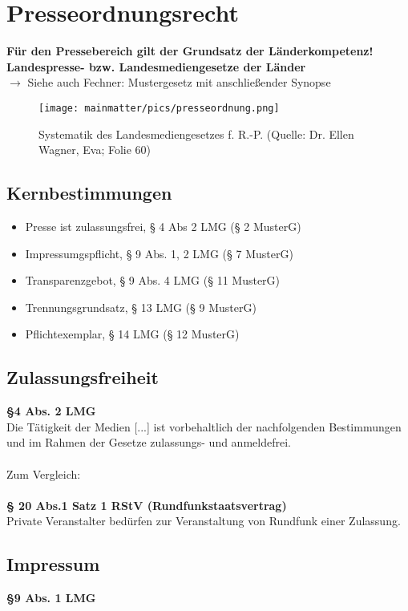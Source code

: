\chapter{Presseordnungsrecht}
\textbf{Für den Pressebereich gilt der Grundsatz der Länderkompetenz!}\\
\textbf{Landespresse- bzw. Landesmediengesetze der Länder}\\

$\rightarrow$ Siehe auch Fechner: Mustergesetz mit anschließender Synopse\\
\begin{figure}[ht]
	\centering
	\texttt{[image: mainmatter/pics/presseordnung.png]}
	\caption[Systematik des Landesmediengesetzes f. R.-P.]{Systematik des Landesmediengesetzes f. R.-P. (Quelle: Dr. Ellen Wagner, Eva; Folie 60)} 
	\label{LMG}
\end{figure}
\section {Kernbestimmungen}
\begin{itemize}
    \item Presse ist zulassungsfrei, § 4 Abs 2 LMG (§ 2 MusterG)
    \item Impressumgspflicht, § 9 Abs. 1, 2 LMG (§ 7 MusterG)
    \item Transparenzgebot, § 9 Abs. 4 LMG (§ 11 MusterG)
    \item Trennungsgrundsatz, § 13 LMG (§ 9 MusterG)
    \item Pflichtexemplar, § 14 LMG (§ 12 MusterG)
\end{itemize}
\section{Zulassungsfreiheit}
\textbf{§4 Abs. 2 LMG}\\
Die Tätigkeit der Medien [...] ist vorbehaltlich der nachfolgenden Bestimmungen und im Rahmen der Gesetze zulassungs- und anmeldefrei.\\
\\
Zum Vergleich:\\
\\
\textbf{§ 20 Abs.1 Satz 1 RStV (Rundfunkstaatsvertrag)}\\
Private Veranstalter bedürfen zur Veranstaltung von Rundfunk
einer Zulassung.
%
%
%
\section{Impressum}
\textbf{§9 Abs. 1 LMG}\\

